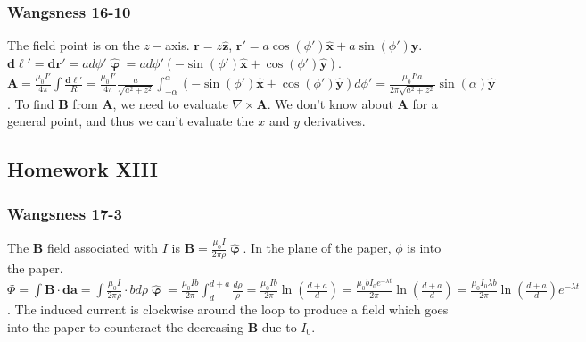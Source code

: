 \documentclass{article}
\theoremstyle{mystyle}
\begin{document}
\subsubsection{Wangsness 16-10}
The field point is on the $z-$axis. $\mathbf{r} = z\hat{\mathbf{z}}$, $\mathbf{r}' =  a\cos(\phi')\hat{\mathbf{x}}+a\sin(\phi')\hat{\mathbf{y}}$. $\mathbf{d\ell}' = \mathbf{dr}' = ad\phi' \hat{\boldsymbol{\upvarphi}} = ad\phi' (-\sin(\phi')\hat{\mathbf{x}}+\cos(\phi')\hat{\mathbf{y}})$. $\mathbf{A} = \frac{\mu_0 I'}{4\pi} \int \frac{\mathbf{d\ell}'}{R} = \frac{\mu_0 I'}{4\pi} \frac{a}{\sqrt{a^2+z^2}}\int_{-\alpha}^{\alpha} (-\sin(\phi')\hat{\mathbf{x}}+\cos(\phi')\hat{\mathbf{y}})d\phi' = \frac{\mu_0 I'a}{2\pi \sqrt{a^2+z^2}}\sin(\alpha)\hat{\mathbf{y}}$. To find $\mathbf{B}$ from $\mathbf{A}$, we need to evaluate $\nabla \times \mathbf{A}$. We don't know about $\mathbf{A}$ for a general point, and thus we can't evaluate the $x$ and $y$ derivatives.
\subsection{Homework XIII}
\subsubsection{Wangsness 17-3}
The $\mathbf{B}$ field associated with $I$ is $\mathbf{B} = \frac{\mu_0 I}{2\pi \rho} \hat{\boldsymbol{\upvarphi}}$. In the plane of the paper, $\phi$ is into the paper. $\Phi = \int \mathbf{B}\cdot \mathbf{da} = \int \frac{\mu_0 I}{2\pi \rho} \cdot b d\rho \hat{\boldsymbol{\upvarphi}} = \frac{\mu_0Ib}{2\pi} \int_{d}^{d+a} \frac{d\rho}{\rho}= \frac{\mu_0 Ib}{2\pi} \ln(\frac{d+a}{d}) = \frac{\mu_0 bI_0 e^{-\lambda t}}{2\pi} \ln(\frac{d+a}{d}) = \frac{\mu_0 I_0 \lambda b}{2\pi} \ln(\frac{d+a}{d})e^{-\lambda t}$. The induced current is clockwise around the loop to produce a field which goes into the paper to counteract the decreasing $\mathbf{B}$ due to $I_0$.
\end{document}
